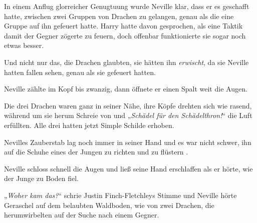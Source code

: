 In einem Anflug glorreicher Genugtuung wurde Neville klar, dass er es geschafft hatte, zwischen zwei Gruppen von Drachen zu gelangen, genau als die eine Gruppe auf ihn gefeuert hatte. Harry hatte davon gesprochen, als eine Taktik damit der Gegner zögerte zu feuern, doch offenbar funktionierte sie sogar noch etwas besser.

Und nicht nur das, die Drachen glaubten, sie hätten ihn \emph{erwischt}, da sie Neville hatten fallen sehen, genau als sie gefeuert hatten.

Neville zählte im Kopf bis zwanzig, dann öffnete er einen Spalt weit die Augen.

Die drei Drachen waren ganz in seiner Nähe, ihre Köpfe drehten sich wie rasend, während um sie herum Schreie von  und
„\emph{Schädel für den Schädelthron!}“ die Luft erfüllten. Alle drei hatten jetzt Simple Schilde erhoben.

Nevilles Zauberstab lag noch immer in seiner Hand und es war nicht schwer, ihn auf die Schuhe eines der Jungen zu richten und zu flüstern .

Neville schloss schnell die Augen und ließ seine Hand erschlaffen als er hörte, wie der Junge zu Boden fiel.

„\emph{Woher kam das?}“ schrie Justin Finch-Fletchleys Stimme und Neville hörte Geraschel auf dem belaubten Waldboden, wie von zwei Drachen, die herumwirbelten auf der Suche nach einem Gegner.

